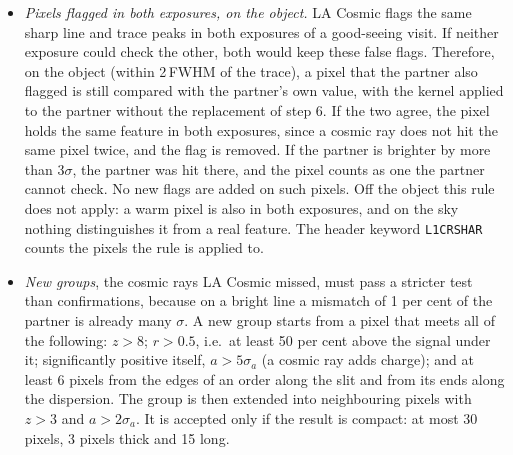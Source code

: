 \begin{enumerate}
\begin{itemize}
stays flagged in full. The partner cannot check a pixel that is masked in it; a pixel that it also flags, if the pixel
is off the object (this is how a warm pixel looks); a pixel at the edge of an order; or a pixel where the matched
partner differs from the frame over an extended area (the median of $|z|$ over $5\times5$ pixels is above 2). Such
extended differences occur because the residual 2-d fringes of the red order stay at the same place on the detector
while the partner is shifted onto the trace of the frame, and because the match can fail at the end of an order. A
cosmic ray is compact, so an extended difference says nothing about one. This affects 0.04--4 per cent of an order in
the frames we examined (header keyword \texttt{L1CRMISM}).
\item \textit{Pixels flagged in both exposures, on the object.} LA Cosmic flags the same sharp line and trace peaks in
both exposures of a good-seeing visit. If neither exposure could check the other, both would keep these false flags.
Therefore, on the object (within 2\,FWHM of the trace), a pixel that the partner also flagged is still compared with
the partner's own value, with the kernel applied to the partner without the replacement of step 6. If the two agree,
the pixel holds the same feature in both exposures, since a cosmic ray does not hit the same pixel twice, and the flag
is removed. If the partner is brighter by more than 3$\sigma$, the partner was hit there, and the pixel counts as one
the partner cannot check. No new flags are added on such pixels. Off the object this rule does not apply: a warm pixel
is also in both exposures, and on the sky nothing distinguishes it from a real feature. The header keyword
\texttt{L1CRSHAR} counts the pixels the rule is applied to.
\item \textit{New groups}, the cosmic rays LA Cosmic missed, must pass a stricter test than confirmations, because on a
bright line a mismatch of 1 per cent of the partner is already many $\sigma$. A new group starts from a pixel that
meets all of the following: $z>8$; $r>0.5$, i.e.\ at least 50 per cent above the signal under it; significantly
positive itself, $a>5\sigma_a$ (a cosmic ray adds charge); and at least 6 pixels from the edges of an order along the
slit and from its ends along the dispersion. The group is then extended into neighbouring pixels with $z>3$ and
$a>2\sigma_a$. It is accepted only if the result is compact: at most 30 pixels, 3 pixels thick and 15 long.
\end{itemize}
\end{enumerate}
